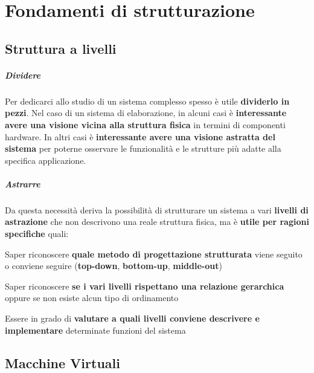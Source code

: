 \documentclass[10pt]{report}
\begin{document}
\chapter{Fondamenti di strutturazione}
\section{Struttura a livelli}
\paragraph{Dividere} Per dedicarci allo studio di un sistema complesso spesso è utile \textbf{dividerlo in pezzi}. Nel caso di un sistema di elaborazione, in alcuni casi è \textbf{interessante avere una visione vicina alla struttura fisica} in termini di componenti hardware. In altri casi è \textbf{interessante avere una visione astratta del sistema} per poterne osservare le funzionalità e le strutture più adatte alla specifica applicazione.
\paragraph{Astrarre} Da questa necessità deriva la possibilità di strutturare un sistema a vari \textbf{livelli di astrazione} che non descrivono una reale struttura fisica, ma è \textbf{utile per ragioni specifiche} quali:
\begin{list}{}{}
\item Saper riconoscere \textbf{quale metodo di progettazione strutturata} viene seguito o conviene seguire (\textbf{top-down}, \textbf{bottom-up}, \textbf{middle-out})
\item Saper riconoscere \textbf{se i vari livelli rispettano una relazione gerarchica} oppure se non esiste alcun tipo di ordinamento
\item Essere in grado di \textbf{valutare a quali livelli conviene descrivere e implementare} determinate funzioni del sistema
\end{list}
\section{Macchine Virtuali}
\end{document}
